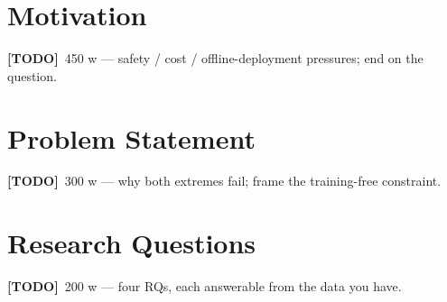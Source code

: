 \documentclass[11pt,a4paper]{report}
\newcommand{\todo}[1]{\par\noindent\textcolor{red!70!black}{\small\textbf{[TODO]}~#1}\par}
\begin{document}
\section{Motivation}
\label{sec:intro-motivation}
\todo{450 w — safety / cost / offline-deployment pressures; end on the question.}

\section{Problem Statement}
\label{sec:intro-problem}
\todo{300 w — why both extremes fail; frame the training-free constraint.}

\section{Research Questions}
\label{sec:intro-rqs}
\todo{200 w — four RQs, each answerable from the data you have.}
\end{document}
